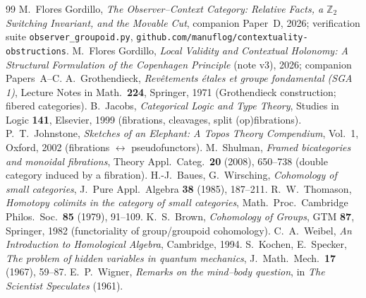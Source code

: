 \documentclass[11pt]{article}
\theoremstyle{definition}
\theoremstyle{remark}
\begin{document}
\begin{thebibliography}{99}\small
{} M.\ Flores Gordillo, \emph{The Observer--Context Category: Relative
Facts, a $\mathbb Z_2$ Switching Invariant, and the Movable Cut}, companion Paper~D,
2026; verification suite \texttt{observer\_groupoid.py},
\texttt{github.com/manuflog/contextuality-obstructions}.
 M.\ Flores Gordillo, \emph{Local Validity and Contextual Holonomy: A
Structural Formulation of the Copenhagen Principle} (note v3), 2026; companion
Papers~A--C.
 A.\ Grothendieck, \emph{Rev\^etements \'etales et groupe fondamental
(SGA 1)}, Lecture Notes in Math.\ \textbf{224}, Springer, 1971 (Grothendieck
construction; fibered categories).
 B.\ Jacobs, \emph{Categorical Logic and Type Theory}, Studies in
Logic \textbf{141}, Elsevier, 1999 (fibrations, cleavages, split (op)fibrations).
 P.\ T.\ Johnstone, \emph{Sketches of an Elephant: A Topos Theory
Compendium}, Vol.~1, Oxford, 2002 (fibrations $\leftrightarrow$ pseudofunctors).
 M.\ Shulman, \emph{Framed bicategories and monoidal fibrations},
Theory Appl.\ Categ.\ \textbf{20} (2008), 650--738 (double category induced by a
fibration).
 H.-J.\ Baues, G.\ Wirsching, \emph{Cohomology of small
categories}, J.\ Pure Appl.\ Algebra \textbf{38} (1985), 187--211.
 R.\ W.\ Thomason, \emph{Homotopy colimits in the category of small
categories}, Math.\ Proc.\ Cambridge Philos.\ Soc.\ \textbf{85} (1979), 91--109.
 K.\ S.\ Brown, \emph{Cohomology of Groups}, GTM \textbf{87}, Springer,
1982 (functoriality of group/groupoid cohomology).
 C.\ A.\ Weibel, \emph{An Introduction to Homological Algebra},
Cambridge, 1994.
 S.\ Kochen, E.\ Specker, \emph{The problem of hidden variables in quantum
mechanics}, J.\ Math.\ Mech.\ \textbf{17} (1967), 59--87.
 E.\ P.\ Wigner, \emph{Remarks on the mind--body question}, in
\emph{The Scientist Speculates} (1961).
\end{thebibliography}
\end{document}
